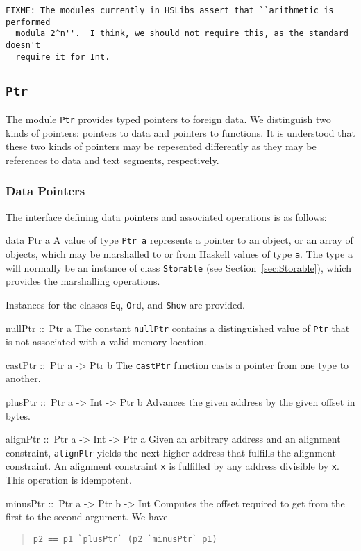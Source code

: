 \documentclass[a4paper,twosides]{article}
\makeatletter
\newcommand{\code}[1]{\texttt{#1}}      %
\newenvironment{codedesc}{%
  \list{}{\labelwidth\z@ %
    \let\makelabel\codedesclabel}
  }{%
  \endlist
  }
\newcommand*{\codedesclabel}[1]{%
  \hspace{-\leftmargin}
  \parbox[b]{\labelwidth}{\makebox[0pt][l]{\code{#1}}\\}\hfil\relax
  }
\makeatother
\begin{document}
\begin{verbatim}
FIXME: The modules currently in HSLibs assert that ``arithmetic is performed
  modula 2^n''.  I think, we should not require this, as the standard doesn't
  require it for Int.
\end{verbatim}

\subsection{\code{Ptr}}
\label{sec:Ptr}

The module \code{Ptr} provides typed pointers to foreign data.  We distinguish
two kinds of pointers: pointers to data and pointers to functions.  It is
understood that these two kinds of pointers may be repesented differently as
they may be references to data and text segments, respectively.

\subsubsection{Data Pointers}

The interface defining data pointers and associated operations is as follows:
%
\begin{codedesc}
\item[data Ptr a] A value of type \code{Ptr a} represents a pointer to an
  object, or an array of objects, which may be marshalled to or from Haskell
  values of type \code{a}.  The type a will normally be an instance of class
  \code{Storable} (see Section~\ref{sec:Storable}), which provides the
  marshalling operations.

  Instances for the classes \code{Eq}, \code{Ord}, and \code{Show} are
  provided. 
\item[nullPtr ::\ Ptr a] The constant \code{nullPtr} contains a distinguished
  value of \code{Ptr} that is not associated with a valid memory location.
\item[castPtr ::\ Ptr a -> Ptr b] The \code{castPtr} function casts a pointer
  from one type to another.
\item[plusPtr ::\ Ptr a -> Int -> Ptr b] Advances the given address by the
  given offset in bytes.
\item[alignPtr ::\ Ptr a -> Int -> Ptr a] Given an arbitrary address and an
  alignment constraint, \code{alignPtr} yields the next higher address that
  fulfills the alignment constraint. An alignment constraint \code{x} is
  fulfilled by any address divisible by \code{x}. This operation is
  idempotent.
\item[minusPtr ::\ Ptr a -> Ptr b -> Int] Computes the offset required to get
  from the first to the second argument.  We have
  \begin{quote}
\begin{verbatim}
p2 == p1 `plusPtr` (p2 `minusPtr` p1)
\end{verbatim}
  \end{quote}
\end{codedesc}
\end{document}
